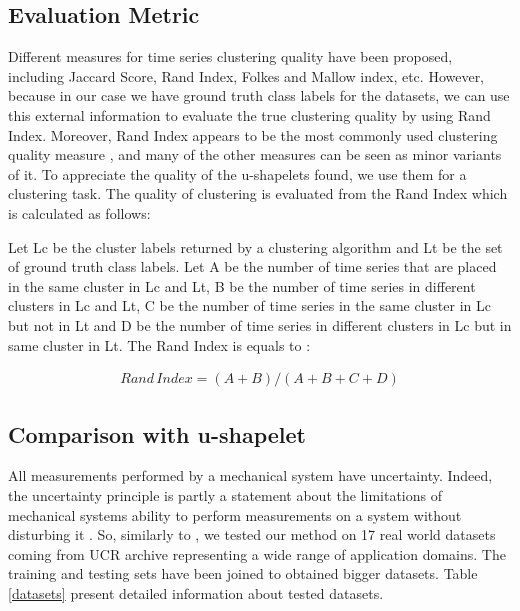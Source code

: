 \subsection{Evaluation Metric}
Different measures for time series clustering quality have been proposed, including Jaccard Score, Rand Index, Folkes and Mallow index, etc. However, because in our case we have ground truth class labels for the datasets, we can use this external information to evaluate the true clustering quality by using Rand Index. Moreover, Rand Index appears to be the most commonly used clustering quality measure \cite{zakaria2012clustering, ulanova2015scalable, zhang2016unsupervised}, and many of the other measures can be seen as minor variants of it\cite{halkidi2001clustering}.
To appreciate the quality of the u-shapelets found, we use them for a clustering task. The quality of clustering is evaluated from the Rand Index \cite{rand1971objective} which is calculated as follows:

Let Lc be the cluster labels returned by a clustering algorithm and Lt be the
set of ground truth class labels. Let A be the number of time series that are
placed in the same cluster in Lc and Lt, B be the number of time series in
different clusters in Lc and Lt, C be the number of time series in the same
cluster in Lc but not in Lt and D be the number of time series in different
clusters in Lc but in same cluster in Lt. The Rand Index is equals to : 

\begin{eqnarray}
Rand\,Index = (A+B)/(A+B+C+D)
\end{eqnarray}    

\subsection{Comparison with u-shapelet}
All measurements performed by a mechanical system have uncertainty. Indeed, the uncertainty principle is partly a statement about the limitations of mechanical systems ability to perform measurements on a system without disturbing it \cite{folland1997uncertainty}. So, similarly to \cite{dallachiesa}, we tested our method on 17 real world datasets coming from UCR archive \cite{UCRArchive} representing a wide range of application domains. The training and testing sets have been joined to obtained bigger datasets. Table \ref{datasets} present detailed information about tested datasets.





